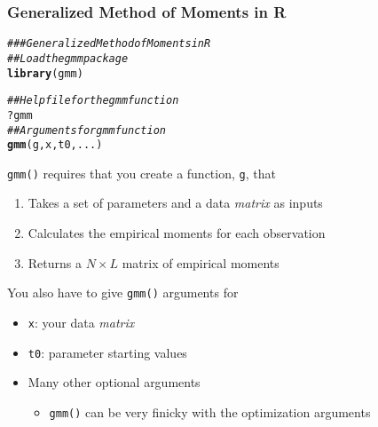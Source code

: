 \documentclass{beamer}\usepackage[]{graphicx}\usepackage[]{color}
\makeatletter
\newcommand{\hlcom}[1]{\textcolor[rgb]{0.678,0.584,0.686}{\textit{#1}}}%
\newcommand{\hlopt}[1]{\textcolor[rgb]{0,0,0}{#1}}%
\newcommand{\hlstd}[1]{\textcolor[rgb]{0.345,0.345,0.345}{#1}}%
\newcommand{\hlkwd}[1]{\textcolor[rgb]{0.737,0.353,0.396}{\textbf{#1}}}%
\newenvironment{kframe}{%
 \def\at@end@of@kframe{}%
 \ifinner\ifhmode%
  \def\at@end@of@kframe{\end{minipage}}%
  \begin{minipage}{\columnwidth}%
 \fi\fi%
 \def\FrameCommand##1{\hskip\@totalleftmargin \hskip-\fboxsep
 \colorbox{shadecolor}{##1}\hskip-\fboxsep
     \hskip-\linewidth \hskip-\@totalleftmargin \hskip\columnwidth}%
 \MakeFramed {\advance\hsize-\width
   \@totalleftmargin\z@ \linewidth\hsize
   \@setminipage}}%
 {\par\unskip\endMakeFramed%
 \at@end@of@kframe}
\newenvironment{knitrout}{}{} %
\makeatother
\begin{document}
\begin{frame}[fragile]\frametitle{Generalized Method of Moments in R}
\begin{knitrout}\footnotesize
{}\color{fgcolor}\begin{kframe}
\begin{alltt}
\hlcom{### Generalized Method of Moments in R}
\hlcom{## Load the gmm package}
\hlkwd{library}\hlstd{(gmm)}
\end{alltt}
\end{kframe}
\end{knitrout}
\begin{knitrout}\footnotesize
{}\color{fgcolor}\begin{kframe}
\begin{alltt}
\hlcom{## Help file for the gmm function}
\hlopt{?}\hlstd{gmm}
\hlcom{## Arguments for gmm function}
\hlkwd{gmm}\hlstd{(g, x, t0, ...)}
\end{alltt}
\end{kframe}
\end{knitrout}
    \texttt{gmm()} requires that you create a function, \texttt{g}, that
    \begin{enumerate}
        \item Takes a set of parameters and a data \emph{matrix} as inputs
        \item Calculates the empirical moments for each observation
        \item Returns a $N \times L$ matrix of empirical moments
    \end{enumerate}
    You also have to give \texttt{gmm()} arguments for
    \begin{itemize}
        \item \texttt{x}: your data \emph{matrix}
        \item \texttt{t0}: parameter starting values
        \item Many other optional arguments
        \begin{itemize}
            \item \texttt{gmm()} can be very finicky with the optimization arguments
        \end{itemize}
    \end{itemize}
\end{frame}
\end{document}

